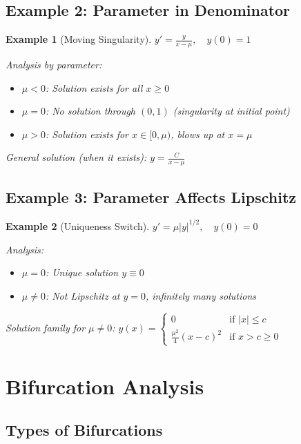 \documentclass[12pt]{article}
\newtheorem{example}{Example}
\begin{document}
\subsection{Example 2: Parameter in Denominator}

\begin{example}[Moving Singularity]
$y' = \frac{y}{x - \mu}, \quad y(0) = 1$

Analysis by parameter:
\begin{itemize}
    \item $\mu < 0$: Solution exists for all $x \geq 0$
    \item $\mu = 0$: No solution through $(0,1)$ (singularity at initial point)
    \item $\mu > 0$: Solution exists for $x \in [0, \mu)$, blows up at $x = \mu$
\end{itemize}

General solution (when it exists): $y = \frac{C}{x - \mu}$
\end{example}

\subsection{Example 3: Parameter Affects Lipschitz}

\begin{example}[Uniqueness Switch]
$y' = \mu|y|^{1/2}, \quad y(0) = 0$

Analysis:
\begin{itemize}
    \item $\mu = 0$: Unique solution $y \equiv 0$
    \item $\mu \neq 0$: Not Lipschitz at $y = 0$, infinitely many solutions
\end{itemize}

Solution family for $\mu \neq 0$:
$y(x) = \begin{cases}
    0 & \text{if } |x| \leq c \\
    \frac{\mu^2}{4}(x-c)^2 & \text{if } x > c \geq 0
\end{cases}$
\end{example}

\section{Bifurcation Analysis}

\subsection{Types of Bifurcations}
\end{document}
